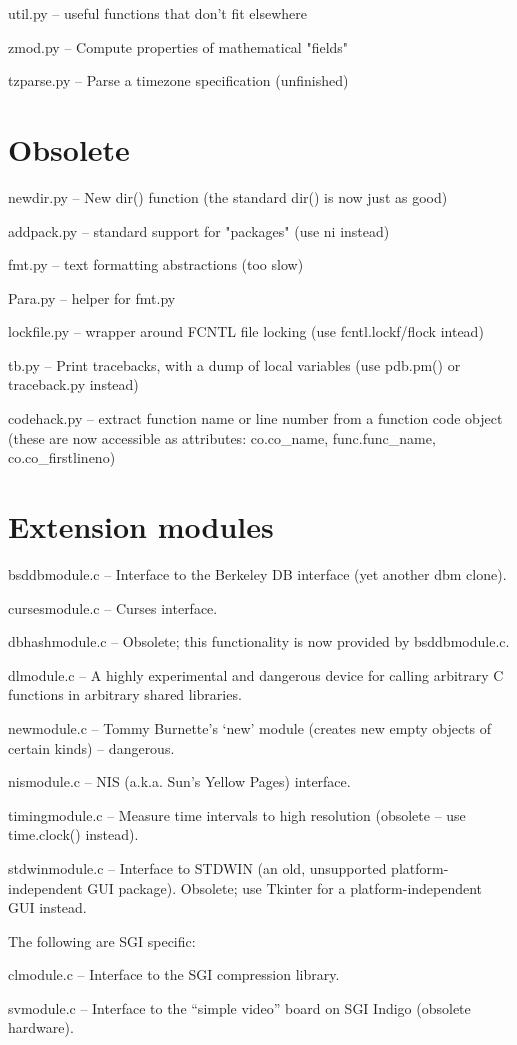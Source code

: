 util.py -- useful functions that don't fit elsewhere

zmod.py -- Compute properties of mathematical "fields"

tzparse.py -- Parse a timezone specification (unfinished)


\section{Obsolete}

newdir.py -- New dir() function (the standard dir() is now just as good)

addpack.py -- standard support for "packages" (use ni instead)

fmt.py -- text formatting abstractions (too slow)

Para.py -- helper for fmt.py

lockfile.py -- wrapper around FCNTL file locking (use
fcntl.lockf/flock intead)

tb.py -- Print tracebacks, with a dump of local variables (use
pdb.pm() or traceback.py instead)

codehack.py -- extract function name or line number from a function
code object (these are now accessible as attributes: co.co_name,
func.func_name, co.co_firstlineno)


\section{Extension modules}

bsddbmodule.c -- Interface to the Berkeley DB interface (yet another
dbm clone).

cursesmodule.c -- Curses interface.

dbhashmodule.c -- Obsolete; this functionality is now provided by
bsddbmodule.c.

dlmodule.c --  A highly experimental and dangerous device for calling
arbitrary C functions in arbitrary shared libraries.

newmodule.c -- Tommy Burnette's `new' module (creates new empty
objects of certain kinds) -- dangerous.

nismodule.c -- NIS (a.k.a. Sun's Yellow Pages) interface.

timingmodule.c -- Measure time intervals to high resolution (obsolete
-- use time.clock() instead).

stdwinmodule.c -- Interface to STDWIN (an old, unsupported
platform-independent GUI package).  Obsolete; use Tkinter for a
platform-independent GUI instead.

The following are SGI specific:

clmodule.c -- Interface to the SGI compression library.

svmodule.c -- Interface to the ``simple video'' board on SGI Indigo
(obsolete hardware).
